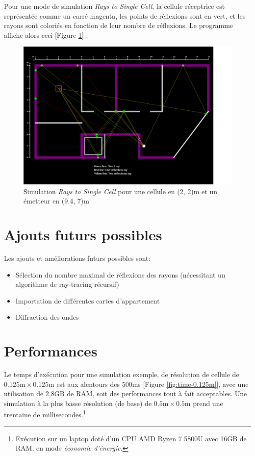 Pour une mode de simulation \textit{Rays to Single Cell}, la cellule réceptrice est représentée comme un carré magenta, les points de réflexions sont en vert, et les rayons sont coloriés en fonction de leur nombre de réflexions. Le programme affiche alors ceci [Figure \ref{fig:simu-single-cell}] :
\begin{figure}[H]
    \centering
    \includegraphics[width=\textwidth]{latex/images/single-cell.png}
    \caption{Simulation \textit{Rays to Single Cell} pour une cellule en (2, 2)m et un émetteur en (9.4, 7)m}
    \label{fig:simu-single-cell}
\end{figure}

\section{Ajouts futurs possibles}
Les ajouts et améliorations futurs possibles sont:
\begin{itemize}
    \item Sélection du nombre maximal de réflexions des rayons (nécessitant un algorithme de ray-tracing récursif)
    \item Importation de différentes cartes d'appartement
    \item Diffraction des ondes
\end{itemize}

\section{Performances}
Le temps d'exécution pour une simulation exemple, de résolution de cellule de $0.125\mathrm{m}\times0.125\mathrm{m}$ est aux alentours des 500ms [Figure \ref{fig:time-0.125m}], avec une utilisation de 2,8GB de RAM, soit des performances tout à fait acceptables. Une simulation à la plus basse résolution (de base) de $0.5\mathrm{m}\times0.5\mathrm{m}$ prend une trentaine de millisecondes.\footnote{Exécution sur un laptop doté d'un CPU AMD Ryzen 7 5800U avec 16GB de RAM, en mode \textit{économie d'énergie}.}

